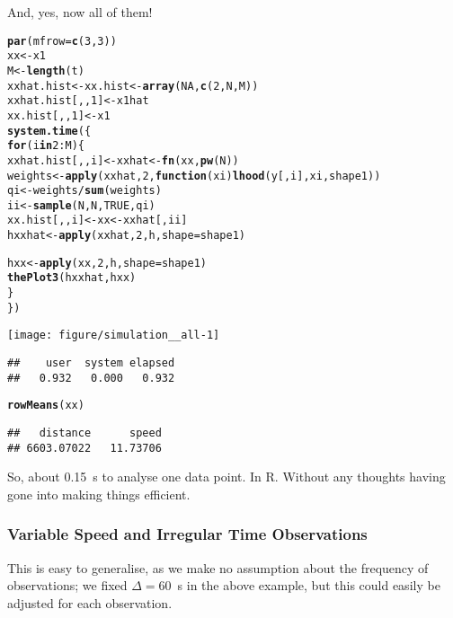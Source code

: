 \documentclass[11pt]{article}\usepackage[]{graphicx}\usepackage[]{color}
\makeatletter
\def\maxwidth{ %
  \ifdim\Gin@nat@width>\linewidth
    \linewidth
  \else
    \Gin@nat@width
  \fi
}
\newcommand{\hlnum}[1]{\textcolor[rgb]{0.686,0.059,0.569}{#1}}%
\newcommand{\hlopt}[1]{\textcolor[rgb]{0,0,0}{#1}}%
\newcommand{\hlstd}[1]{\textcolor[rgb]{0.345,0.345,0.345}{#1}}%
\newcommand{\hlkwa}[1]{\textcolor[rgb]{0.161,0.373,0.58}{\textbf{#1}}}%
\newcommand{\hlkwb}[1]{\textcolor[rgb]{0.69,0.353,0.396}{#1}}%
\newcommand{\hlkwc}[1]{\textcolor[rgb]{0.333,0.667,0.333}{#1}}%
\newcommand{\hlkwd}[1]{\textcolor[rgb]{0.737,0.353,0.396}{\textbf{#1}}}%
\newenvironment{kframe}{%
 \def\at@end@of@kframe{}%
 \ifinner\ifhmode%
  \def\at@end@of@kframe{\end{minipage}}%
  \begin{minipage}{\columnwidth}%
 \fi\fi%
 \def\FrameCommand##1{\hskip\@totalleftmargin \hskip-\fboxsep
 \colorbox{shadecolor}{##1}\hskip-\fboxsep
     \hskip-\linewidth \hskip-\@totalleftmargin \hskip\columnwidth}%
 \MakeFramed {\advance\hsize-\width
   \@totalleftmargin\z@ \linewidth\hsize
   \@setminipage}}%
 {\par\unskip\endMakeFramed%
 \at@end@of@kframe}
\newenvironment{knitrout}{}{} %
\makeatother
\begin{document}
And, yes, now all of them!

\begin{knitrout}
\color{fgcolor}\begin{kframe}
\begin{alltt}
\hlkwd{par}\hlstd{(}\hlkwc{mfrow} \hlstd{=} \hlkwd{c}\hlstd{(}\hlnum{3}\hlstd{,} \hlnum{3}\hlstd{))}
\hlstd{xx} \hlkwb{<-} \hlstd{x1}
\hlstd{M} \hlkwb{<-} \hlkwd{length}\hlstd{(t)}
\hlstd{xxhat.hist} \hlkwb{<-} \hlstd{xx.hist} \hlkwb{<-} \hlkwd{array}\hlstd{(}\hlnum{NA}\hlstd{,} \hlkwd{c}\hlstd{(}\hlnum{2}\hlstd{, N, M))}
\hlstd{xxhat.hist[,,}\hlnum{1}\hlstd{]} \hlkwb{<-} \hlstd{x1hat}
\hlstd{xx.hist[,,}\hlnum{1}\hlstd{]} \hlkwb{<-} \hlstd{x1}
\hlkwd{system.time}\hlstd{(\{}
    \hlkwa{for} \hlstd{(i} \hlkwa{in} \hlnum{2}\hlopt{:}\hlstd{M) \{}
        \hlstd{xxhat.hist[,,i]} \hlkwb{<-} \hlstd{xxhat} \hlkwb{<-} \hlkwd{fn}\hlstd{(xx,} \hlkwd{pw}\hlstd{(N))}
        \hlstd{weights} \hlkwb{<-} \hlkwd{apply}\hlstd{(xxhat,} \hlnum{2}\hlstd{,} \hlkwa{function}\hlstd{(}\hlkwc{xi}\hlstd{)} \hlkwd{lhood}\hlstd{(y[, i], xi, shape1))}
        \hlstd{qi} \hlkwb{<-} \hlstd{weights} \hlopt{/} \hlkwd{sum}\hlstd{(weights)}
        \hlstd{ii} \hlkwb{<-} \hlkwd{sample}\hlstd{(N, N,} \hlnum{TRUE}\hlstd{, qi)}
        \hlstd{xx.hist[,,i]} \hlkwb{<-} \hlstd{xx} \hlkwb{<-} \hlstd{xxhat[, ii]}
        \hlstd{hxxhat} \hlkwb{<-} \hlkwd{apply}\hlstd{(xxhat,} \hlnum{2}\hlstd{, h,} \hlkwc{shape} \hlstd{= shape1)}

        \hlstd{hxx} \hlkwb{<-} \hlkwd{apply}\hlstd{(xx,} \hlnum{2}\hlstd{, h,} \hlkwc{shape} \hlstd{= shape1)}
        \hlkwd{thePlot3}\hlstd{(hxxhat, hxx)}
    \hlstd{\}}
\hlstd{\})}
\end{alltt}
\end{kframe}

{\centering \texttt{[image: figure/simulation\_\_all-1]} 

}


\begin{kframe}\begin{verbatim}
##    user  system elapsed 
##   0.932   0.000   0.932
\end{verbatim}
\begin{alltt}
\hlkwd{rowMeans}\hlstd{(xx)}
\end{alltt}
\begin{verbatim}
##   distance      speed 
## 6603.07022   11.73706
\end{verbatim}
\end{kframe}
\end{knitrout}

So, about 0.15~s to analyse one data point. In R. Without any thoughts having gone into making
things efficient.


\subsubsection{Variable Speed and Irregular Time Observations}

This is easy to generalise, as we make no assumption about the frequency of observations;
we fixed $\Delta = 60$~s in the above example, but this could easily be adjusted for each observation.
\end{document}
